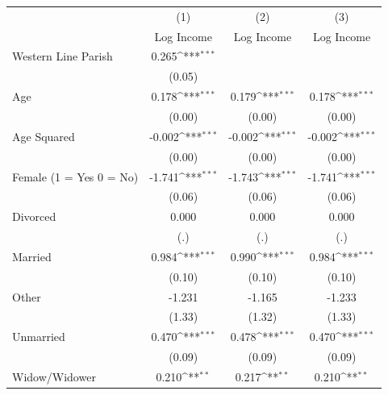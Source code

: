 {
\def\sym#1{\ifmmode^{#1}\else\(^{#1}\)\fi}
\begin{tabular}{l*{3}{c}}
\hline\hline
                    &\multicolumn{1}{c}{(1)}&\multicolumn{1}{c}{(2)}&\multicolumn{1}{c}{(3)}\\
                    &\multicolumn{1}{c}{Log Income}&\multicolumn{1}{c}{Log Income}&\multicolumn{1}{c}{Log Income}\\
\hline
Western Line Parish &       0.265\sym{***}&                     &                     \\
                    &      (0.05)         &                     &                     \\
Age                 &       0.178\sym{***}&       0.179\sym{***}&       0.178\sym{***}\\
                    &      (0.00)         &      (0.00)         &      (0.00)         \\
Age Squared         &      -0.002\sym{***}&      -0.002\sym{***}&      -0.002\sym{***}\\
                    &      (0.00)         &      (0.00)         &      (0.00)         \\
Female (1 = Yes 0 = No)&      -1.741\sym{***}&      -1.743\sym{***}&      -1.741\sym{***}\\
                    &      (0.06)         &      (0.06)         &      (0.06)         \\
Divorced            &       0.000         &       0.000         &       0.000         \\
                    &         (.)         &         (.)         &         (.)         \\
Married             &       0.984\sym{***}&       0.990\sym{***}&       0.984\sym{***}\\
                    &      (0.10)         &      (0.10)         &      (0.10)         \\
Other               &      -1.231         &      -1.165         &      -1.233         \\
                    &      (1.33)         &      (1.32)         &      (1.33)         \\
Unmarried           &       0.470\sym{***}&       0.478\sym{***}&       0.470\sym{***}\\
                    &      (0.09)         &      (0.09)         &      (0.09)         \\
Widow/Widower       &       0.210\sym{**} &       0.217\sym{**} &       0.210\sym{**} \\

\end{tabular}}
